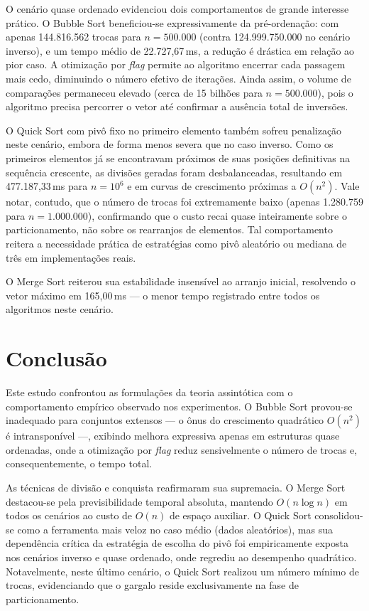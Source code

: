\documentclass[12pt]{article}
\begin{document}
O cenário quase ordenado evidenciou dois comportamentos de grande interesse
prático. O Bubble Sort beneficiou-se expressivamente da pré-ordenação: com
apenas 144.816.562 trocas para $n = 500.000$ (contra 124.999.750.000 no
cenário inverso), e um tempo médio de 22.727,67\,ms, a redução é drástica em
relação ao pior caso. A otimização por \textit{flag} permite ao algoritmo
encerrar cada passagem mais cedo, diminuindo o número efetivo de iterações.
Ainda assim, o volume de comparações permaneceu elevado (cerca de 15 bilhões
para $n = 500.000$), pois o algoritmo precisa percorrer o vetor até confirmar
a ausência total de inversões.

O Quick Sort com pivô fixo no primeiro elemento também sofreu penalização
neste cenário, embora de forma menos severa que no caso inverso. Como os
primeiros elementos já se encontravam próximos de suas posições definitivas
na sequência crescente, as divisões geradas foram desbalanceadas, resultando
em 477.187,33\,ms para $n = 10^6$ e em curvas de crescimento próximas a
$O(n^2)$. Vale notar, contudo, que o número de trocas foi extremamente baixo
(apenas 1.280.759 para $n = 1.000.000$), confirmando que o custo recai quase
inteiramente sobre o particionamento, não sobre os rearranjos de elementos.
Tal comportamento reitera a necessidade prática de estratégias como pivô
aleatório ou mediana de três em implementações reais.

O Merge Sort reiterou sua estabilidade insensível ao arranjo inicial,
resolvendo o vetor máximo em 165,00\,ms — o menor tempo registrado entre
todos os algoritmos neste cenário.

\section{Conclusão}

Este estudo confrontou as formulações da teoria assintótica com o
comportamento empírico observado nos experimentos. O Bubble Sort provou-se
inadequado para conjuntos extensos — o ônus do crescimento quadrático
$O(n^2)$ é intransponível —, exibindo melhora expressiva apenas em
estruturas quase ordenadas, onde a otimização por \textit{flag} reduz
sensivelmente o número de trocas e, consequentemente, o tempo total.

As técnicas de divisão e conquista reafirmaram sua supremacia. O Merge Sort
destacou-se pela previsibilidade temporal absoluta, mantendo $O(n \log n)$
em todos os cenários ao custo de $O(n)$ de espaço auxiliar. O Quick Sort
consolidou-se como a ferramenta mais veloz no caso médio (dados aleatórios),
mas sua dependência crítica da estratégia de escolha do pivô foi empiricamente
exposta nos cenários inverso e quase ordenado, onde regrediu ao desempenho
quadrático. Notavelmente, neste último cenário, o Quick Sort realizou um
número mínimo de trocas, evidenciando que o gargalo reside exclusivamente na
fase de particionamento.
\end{document}
